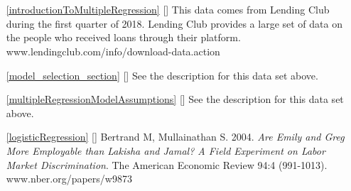 \section{}
\label{ch_regr_mult_and_log_data}

\begin{itemize}
\item[\ref{introductionToMultipleRegression}]
    [\datalink{loans\_full\_schema}]
    This data comes from Lending Club during
    the first quarter of 2018.
    Lending Club provides a large set of data on the people
    who received loans through their platform.
        {www.lendingclub.com/info/download-data.action}

\item[\ref{model_selection_section}]
    [\datalink{loans\_full\_schema}]
    See the description for this data set above.

\item[\ref{multipleRegressionModelAssumptions}]
    [\datalink{loans\_full\_schema}]
    See the description for this data set above.

\item[\ref{logisticRegression}]
    [\datalink{resume}]
    Bertrand M, Mullainathan S. 2004.
    \emph{Are Emily and Greg More Employable than Lakisha and Jamal?
    A Field Experiment on Labor Market Discrimination}.
    The American Economic Review 94:4 (991-1013).
        {www.nber.org/papers/w9873}

\end{itemize}

